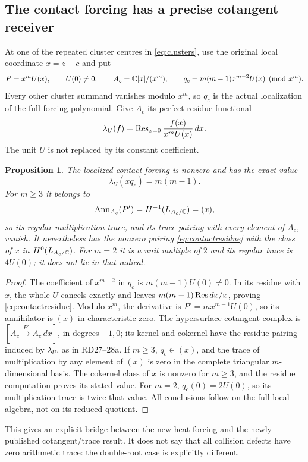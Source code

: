 \documentclass[11pt,a4paper]{article}
\newtheorem{proposition}[theorem]{Proposition}
\theoremstyle{definition}
\begin{document}
\subsection{The contact forcing has a precise cotangent receiver}
At one of the repeated cluster centres in \eqref{eq:clusters}, use the original local coordinate $x=z-c$ and put
\[
 P=x^mU(x),\qquad U(0)\ne0,\qquad
 A_c=\mathbb C[x]/(x^m),\qquad
 q_c=m(m-1)x^{m-2}U(x)\pmod{x^m}.
\]
Every other cluster summand vanishes modulo $x^m$, so $q_c$ is the actual localization of the full forcing polynomial. Give $A_c$ its perfect residue functional
\[
 \lambda_U(f)=\operatorname{Res}_{x=0}\frac{f(x)}{x^mU(x)}\,dx.
\]
The unit $U$ is not replaced by its constant coefficient.
\begin{proposition}\label{prop:contactcotangent}
The localized contact forcing is nonzero and has the exact value
\begin{equation}\label{eq:contactresidue}
 \lambda_U(xq_c)=m(m-1).
\end{equation}
For $m\ge3$ it belongs to
\[
 \operatorname{Ann}_{A_c}(P')=H^{-1}(L_{A_c/\mathbb C})=(x),
\]
so its regular multiplication trace, and its trace pairing with every element of $A_c$, vanish. It nevertheless has the nonzero pairing \eqref{eq:contactresidue} with the class of $x$ in $H^0(L_{A_c/\mathbb C})$.
For $m=2$ it is a unit multiple of $2$ and its regular trace is $4U(0)$; it does not lie in that radical.
\end{proposition}
\begin{proof}
The coefficient of $x^{m-2}$ in $q_c$ is $m(m-1)U(0)\ne0$. In its residue with $x$, the whole $U$ cancels exactly and leaves $m(m-1)\operatorname{Res} dx/x$, proving \eqref{eq:contactresidue}. Modulo $x^m$, the derivative is $P'=mx^{m-1}U(0)$, so its annihilator is $(x)$ in characteristic zero. The hypersurface cotangent complex is $[A_c\xrightarrow{P'}A_c\,dx]$, in degrees $-1,0$; its kernel and cokernel have the residue pairing induced by $\lambda_U$, as in RD27--28a. If $m\ge3$, $q_c\in(x)$, and the trace of multiplication by any element of $(x)$ is zero in the complete triangular $m$-dimensional basis. The cokernel class of $x$ is nonzero for $m\ge3$, and the residue computation proves its stated value. For $m=2$, $q_c(0)=2U(0)$, so its multiplication trace is twice that value. All conclusions follow on the full local algebra, not on its reduced quotient.
\end{proof}

This gives an explicit bridge between the new heat forcing and the newly published cotangent/trace result. It does not say that all collision defects have zero arithmetic trace: the double-root case is explicitly different.
\end{document}
